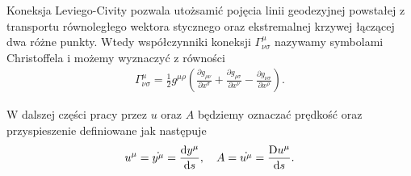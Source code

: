 Koneksja Leviego-Civity pozwala utożsamić pojęcia linii
 geodezyjnej powstałej z transportu równoległego wektora stycznego 
 oraz ekstremalnej krzywej łączącej dwa różne punkty.
 Wtedy współczynniki koneksji 
$\Gamma^\mu_{\nu\sigma}$ nazywamy symbolami Christoffela
i możemy wyznaczyć z równości
\begin{align*}
\Gamma^\mu_{\nu\sigma} = \frac{1}{2} g^{\mu\rho} 
\left(\frac{\partial g_{\rho\nu}}{\partial x^\sigma}+ 
\frac{\partial g_{\rho\sigma}}{\partial x^\nu}-
\frac{\partial g_{\nu\sigma}}{\partial x^\rho}\right).
\end{align*}

W dalszej części pracy przez $u$ oraz $A$ będziemy oznaczać
prędkość oraz przyspieszenie definiowane jak następuje
\begin{align*}
u^\mu = \dot{y^\mu} = \frac{\text{d} y^\mu}{\text{d} s}, 
\quad A = \dot{u^\mu} =  \frac{\text{D} u^\mu}{\text{d} s}.
\end{align*}


